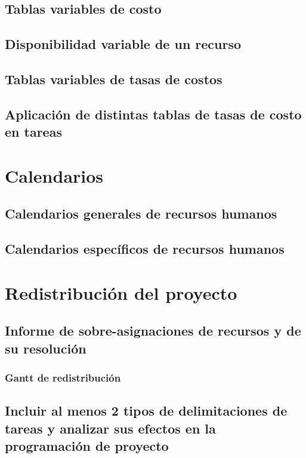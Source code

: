 \documentclass[11pt,a4paper,spanish,twoside]{report}
\begin{document}
\section{Tablas variables de costo}

\section{Disponibilidad variable de un recurso}

\section{Tablas variables de tasas de costos}

\section{Aplicación de distintas tablas de tasas de costo en tareas}

\chapter{Calendarios}
\section{Calendarios generales de recursos humanos}

\section{Calendarios específicos de recursos humanos}

\chapter{Redistribución del proyecto}
\section{Informe de sobre-asignaciones de recursos y de su 
  resolución}
\subsection{Gantt de redistribución}

\section{Incluir al menos 2 tipos de delimitaciones de tareas y 
  analizar sus efectos en la programación de proyecto}
\end{document}
